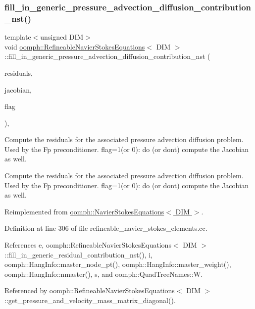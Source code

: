 \subsubsection{\texorpdfstring{fill\+\_\+in\+\_\+generic\+\_\+pressure\+\_\+advection\+\_\+diffusion\+\_\+contribution\+\_\+nst()}{fill\_in\_generic\_pressure\_advection\_diffusion\_contribution\_nst()}}
{\footnotesize\ttfamily template$<$unsigned D\+IM$>$ \\
void \hyperlink{classoomph_1_1RefineableNavierStokesEquations}{oomph\+::\+Refineable\+Navier\+Stokes\+Equations}$<$ D\+IM $>$\+::fill\+\_\+in\+\_\+generic\+\_\+pressure\+\_\+advection\+\_\+diffusion\+\_\+contribution\+\_\+nst (\begin{DoxyParamCaption}\item[{\hyperlink{classoomph_1_1Vector}{Vector}$<$ double $>$ \&}]{residuals,  }\item[{\hyperlink{classoomph_1_1DenseMatrix}{Dense\+Matrix}$<$ double $>$ \&}]{jacobian,  }\item[{unsigned}]{flag }\end{DoxyParamCaption})\hspace{0.3cm}{\ttfamily [protected]}, {\ttfamily [virtual]}}



Compute the residuals for the associated pressure advection diffusion problem. Used by the Fp preconditioner. flag=1(or 0)\+: do (or don\textquotesingle{}t) compute the Jacobian as well. 

Compute the residuals for the associated pressure advection diffusion problem. Used by the Fp preconditioner. flag=1(or 0)\+: do (or don\textquotesingle{}t) compute the Jacobian as well. 

Reimplemented from \hyperlink{classoomph_1_1NavierStokesEquations_a50d5b099e2f2c16028682ee48571f8a4}{oomph\+::\+Navier\+Stokes\+Equations$<$ D\+I\+M $>$}.



Definition at line 306 of file refineable\+\_\+navier\+\_\+stokes\+\_\+elements.\+cc.



References e, oomph\+::\+Refineable\+Navier\+Stokes\+Equations$<$ D\+I\+M $>$\+::fill\+\_\+in\+\_\+generic\+\_\+residual\+\_\+contribution\+\_\+nst(), i, oomph\+::\+Hang\+Info\+::master\+\_\+node\+\_\+pt(), oomph\+::\+Hang\+Info\+::master\+\_\+weight(), oomph\+::\+Hang\+Info\+::nmaster(), s, and oomph\+::\+Quad\+Tree\+Names\+::W.



Referenced by oomph\+::\+Refineable\+Navier\+Stokes\+Equations$<$ D\+I\+M $>$\+::get\+\_\+pressure\+\_\+and\+\_\+velocity\+\_\+mass\+\_\+matrix\+\_\+diagonal().

